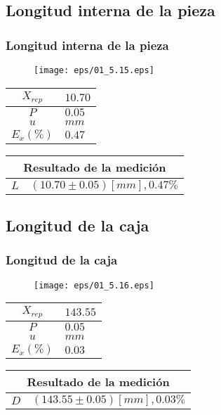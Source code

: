 \documentclass[letter,11pt]{beamer}
\begin{document}
\subsection{Longitud interna de la pieza}
\begin{frame}
\frametitle{Longitud interna de la pieza}
\vspace*{0.8cm}
\begin{figure}
\centering
\texttt{[image: eps/01\_5.15.eps]}
\end{figure}
\vspace*{0.4cm}
\scriptsize
\begin{tabular}{|c|>{\centering}m{1.8cm}<{\centering}|}
\hline
$X_{rep}$ &  $10.70$ \tabularnewline \hline
      $P$ &   $0.05$ \tabularnewline \hline
      $u$ &     $mm$ \tabularnewline \hline
$E_x(\%)$ &   $0.47$ \tabularnewline \hline
\end{tabular}
\quad
\begin{tabular}{|c|>{\centering}m{5.7cm}<{\centering}|}
\hline
\multicolumn{2}{|c|}{\textbf{Resultado de la medición}} \\ \hline
$L$ & $( 10.70\pm0.05)[mm], 0.47\%$ \tabularnewline \hline
\end{tabular}
\end{frame}

\subsection{Longitud de la caja}
\begin{frame}
\frametitle{Longitud de la caja}
\vspace*{0.8cm}
\begin{figure}
\centering
\texttt{[image: eps/01\_5.16.eps]}
\end{figure}
\vspace*{0.4cm}
\scriptsize
\begin{tabular}{|c|>{\centering}m{1.8cm}<{\centering}|}
\hline
$X_{rep}$ & $143.55$ \tabularnewline \hline
      $P$ &   $0.05$ \tabularnewline \hline
      $u$ &     $mm$ \tabularnewline \hline
$E_x(\%)$ &   $0.03$ \tabularnewline \hline
\end{tabular}
\quad
\begin{tabular}{|c|>{\centering}m{5.7cm}<{\centering}|}
\hline
\multicolumn{2}{|c|}{\textbf{Resultado de la medición}} \\ \hline
$D$ & $(143.55\pm0.05)[mm], 0.03\%$ \tabularnewline \hline
\end{tabular}
\end{frame}
\end{document}
